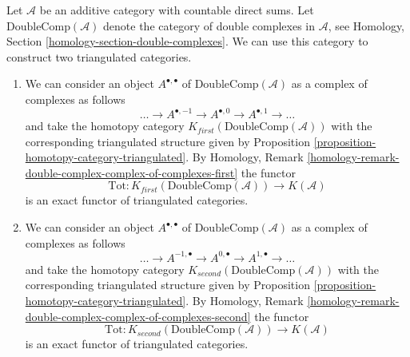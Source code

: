 \begin{remark}
\label{remark-homotopy-double}
Let $\mathcal{A}$ be an additive category with countable direct sums.
Let $\text{DoubleComp}(\mathcal{A})$ denote the category of double complexes
in $\mathcal{A}$, see
Homology, Section \ref{homology-section-double-complexes}.
We can use this category to construct two triangulated categories.
\begin{enumerate}
\item We can consider an object $A^{\bullet, \bullet}$ of
$\text{DoubleComp}(\mathcal{A})$ as a complex of complexes
as follows
$$
\ldots \to A^{\bullet, -1} \to A^{\bullet, 0} \to A^{\bullet, 1} \to \ldots
$$
and take the homotopy category $K_{first}(\text{DoubleComp}(\mathcal{A}))$
with the corresponding triangulated structure given by
Proposition \ref{proposition-homotopy-category-triangulated}.
By Homology, Remark
\ref{homology-remark-double-complex-complex-of-complexes-first} the functor
$$
\text{Tot} :
K_{first}(\text{DoubleComp}(\mathcal{A}))
\longrightarrow
K(\mathcal{A})
$$
is an exact functor of triangulated categories.
\item We can consider an object $A^{\bullet, \bullet}$ of
$\text{DoubleComp}(\mathcal{A})$ as a complex of complexes
as follows
$$
\ldots \to A^{-1, \bullet} \to A^{0, \bullet} \to A^{1, \bullet} \to \ldots
$$
and take the homotopy category $K_{second}(\text{DoubleComp}(\mathcal{A}))$
with the corresponding triangulated structure given by
Proposition \ref{proposition-homotopy-category-triangulated}.
By Homology, Remark
\ref{homology-remark-double-complex-complex-of-complexes-second} the functor
$$
\text{Tot} :
K_{second}(\text{DoubleComp}(\mathcal{A}))
\longrightarrow
K(\mathcal{A})
$$
is an exact functor of triangulated categories.
\end{enumerate}
\end{remark}

